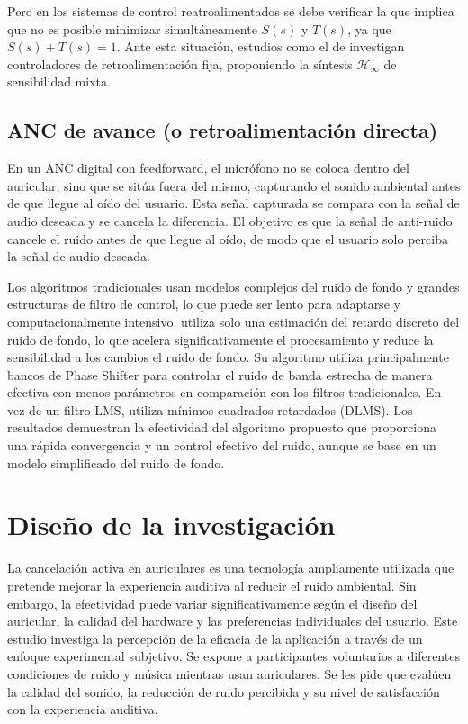 \documentclass[a4paper,12pt]{article}
\begin{document}
Pero en los sistemas de control reatroalimentados se debe verificar la  que implica que no es posible minimizar simultáneamente $S(s)$ y $T(s)$, ya que $S(s) + T(s) = 1$.
Ante esta situación, estudios como el de \textcite{Liebich2016} investigan controladores de retroalimentación fija, proponiendo la síntesis $\mathcal{H}_\infty$ de sensibilidad mixta.

\subsection{ANC de avance (o retroalimentación directa)}

En un ANC digital con feedforward, el micrófono no se coloca dentro del auricular, sino que se sitúa fuera del mismo, capturando el sonido ambiental antes de que llegue al oído del usuario.
Esta señal capturada se compara con la señal de audio deseada y se cancela la diferencia.
El objetivo es que la señal de anti-ruido cancele el ruido antes de que llegue al oído, de modo que el usuario solo perciba la señal de audio deseada.

Los algoritmos tradicionales usan modelos complejos del ruido de fondo y grandes estructuras de filtro de control, lo que puede ser lento para adaptarse y computacionalmente intensivo.
\textcite{Pawelczyk2000} utiliza solo una estimación del retardo discreto del ruido de fondo, lo que acelera significativamente el procesamiento y reduce la sensibilidad a los cambios el ruido de fondo.
Su algoritmo utiliza principalmente bancos de Phase Shifter para controlar el ruido de banda estrecha de manera efectiva con menos parámetros en comparación con los filtros tradicionales.
En vez de un filtro LMS, utiliza mínimos cuadrados retardados (DLMS).
Los resultados demuestran la efectividad del algoritmo propuesto que proporciona una rápida convergencia y un control efectivo del ruido, aunque se base en un modelo simplificado del ruido de fondo.

\section{Diseño de la investigación}

La cancelación activa en auriculares es una tecnología ampliamente utilizada que pretende mejorar la experiencia auditiva al reducir el ruido ambiental.
Sin embargo, la efectividad puede variar significativamente según el diseño del auricular, la calidad del hardware y las preferencias individuales del usuario.
Este estudio investiga la percepción de la eficacia de la aplicación a través de un enfoque experimental subjetivo.
Se expone a participantes voluntarios a diferentes condiciones de ruido y música mientras usan auriculares.
Se les pide que evalúen la calidad del sonido, la reducción de ruido percibida y su nivel de satisfacción con la experiencia auditiva.
\end{document}
